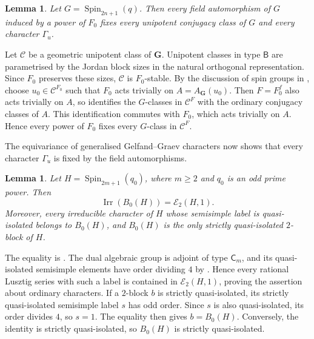 \documentclass[10pt]{amsart}
\newtheorem{lemma}[theorem]{Lemma}
\theoremstyle{definition}
\renewcommand{\geq}{\geqslant}
\let\oldendproof\endproof
\renewenvironment{proof}[1][\proofname]{%
  \oldproof[\bfseries #1]%
}{\oldendproof}
\DeclareMathOperator{\Irr}{Irr}
\numberwithin{equation}{section}
\numberwithin{table}{section}
\begin{document}
\begin{lemma}\label{lem:type-b-rational-field}
Let $G=\operatorname{Spin}_{2n+1}(q)$.
Then every field automorphism of $G$ induced by a power of $F_0$ fixes every
unipotent conjugacy class of $G$ and every character $\Gamma_u$.
\end{lemma}

\begin{proof}
Let $\mathcal C$ be a geometric unipotent class of $\mathbf G$.
Unipotent classes in type $\mathsf B$ are parametrised by the Jordan block
sizes in the natural orthogonal representation.  Since $F_0$ preserves
these sizes, $\mathcal C$ is $F_0$-stable.  By the discussion of spin groups in
\cite[Section~2]{Taylor2013}, choose
$u_0\in\mathcal C^{F_0}$ such that $F_0$ acts trivially on
$A=A_{\mathbf G}(u_0)$.  Then $F=F_0^f$ also acts trivially on $A$, so
\cite[Theorem~21.11]{MalleTesterman2011} identifies the $G$-classes in
$\mathcal C^F$ with the ordinary conjugacy classes of $A$.
This identification commutes with $F_0$, which acts trivially on $A$.
Hence every power of $F_0$ fixes every $G$-class in $\mathcal C^F$.

The equivariance of generalised Gelfand--Graev characters
\cite[Proposition~11.10]{Taylor2018Automorphisms} now shows that every
character $\Gamma_u$ is fixed by the field automorphisms.
\end{proof}

\begin{lemma}\label{lem:type-b-principal-series}
Let $H=\operatorname{Spin}_{2m+1}(q_0)$, where $m\geq2$ and $q_0$ is
an odd prime power. Then
\[
 \Irr(B_0(H))=\mathcal E_2(H,1).
\]
Moreover, every irreducible character of $H$ whose semisimple label is
quasi-isolated belongs to $B_0(H)$, and $B_0(H)$ is the only strictly
quasi-isolated $2$-block of $H$.
\end{lemma}

\begin{proof}
The equality is \cite[Theorem~21.14]{CabanesEnguehard2004}.
The dual algebraic group is adjoint of type $\mathsf C_m$, and its
quasi-isolated semisimple elements have order dividing $4$ by
\cite[Proposition~5.3(a)]{Bonnafe2005}.
Hence every rational Lusztig series with such a label is contained
in $\mathcal E_2(H,1)$, proving the assertion about ordinary characters.
If a $2$-block $b$ is strictly quasi-isolated, its strictly
quasi-isolated semisimple label $s$ has odd order. Since $s$ is also
quasi-isolated, its order divides $4$, so $s=1$.
The equality then gives $b=B_0(H)$.
Conversely, the identity is strictly quasi-isolated, so $B_0(H)$ is
strictly quasi-isolated.
\end{proof}
\end{document}
